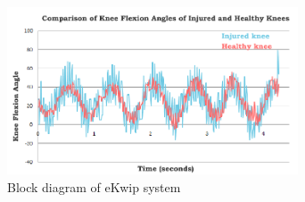 


\begin{figure}[h]
  \begin{center}
    \includegraphics[width=3.4in]{images/results_graph.PNG}
  \end{center}
  \caption{Block diagram of eKwip system}
  \label{fig:results_graph}
\end{figure}